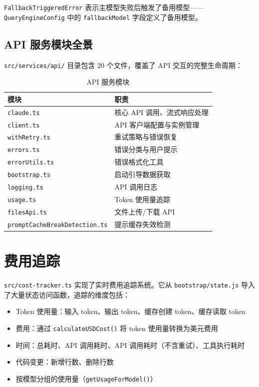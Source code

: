 \texttt{FallbackTriggeredError} 表示主模型失败后触发了备用模型——\texttt{QueryEngineConfig} 中的 \texttt{fallbackModel} 字段定义了备用模型。

\subsection{API 服务模块全景}

\texttt{src/services/api/} 目录包含 20 个文件，覆盖了 API 交互的完整生命周期：

\begin{table}[htbp]
\centering
\begin{tabularx}{\textwidth}{lX}
\toprule
\textbf{模块} & \textbf{职责} \\
\midrule
\texttt{claude.ts} & 核心 API 调用、流式响应处理 \\
\texttt{client.ts} & API 客户端配置与实例管理 \\
\texttt{withRetry.ts} & 重试策略与错误恢复 \\
\texttt{errors.ts} & 错误分类与用户提示 \\
\texttt{errorUtils.ts} & 错误格式化工具 \\
\texttt{bootstrap.ts} & 启动引导数据获取 \\
\texttt{logging.ts} & API 调用日志 \\
\texttt{usage.ts} & Token 使用量追踪 \\
\texttt{filesApi.ts} & 文件上传/下载 API \\
\texttt{promptCacheBreakDetection.ts} & 提示缓存失效检测 \\
\bottomrule
\end{tabularx}
\caption{API 服务模块}
\end{table}

\section{费用追踪}

\texttt{src/cost-tracker.ts} 实现了实时费用追踪系统。它从 \texttt{bootstrap/state.js} 导入了大量状态访问函数，追踪的维度包括：

\begin{itemize}
  \item Token 使用量：输入 token、输出 token、缓存创建 token、缓存读取 token
  \item 费用：通过 \texttt{calculateUSDCost()} 将 token 使用量转换为美元费用
  \item 时间：总耗时、API 调用耗时、API 调用耗时（不含重试）、工具执行耗时
  \item 代码变更：新增行数、删除行数
  \item 按模型分组的使用量（\texttt{getUsageForModel()}）
\end{itemize}

